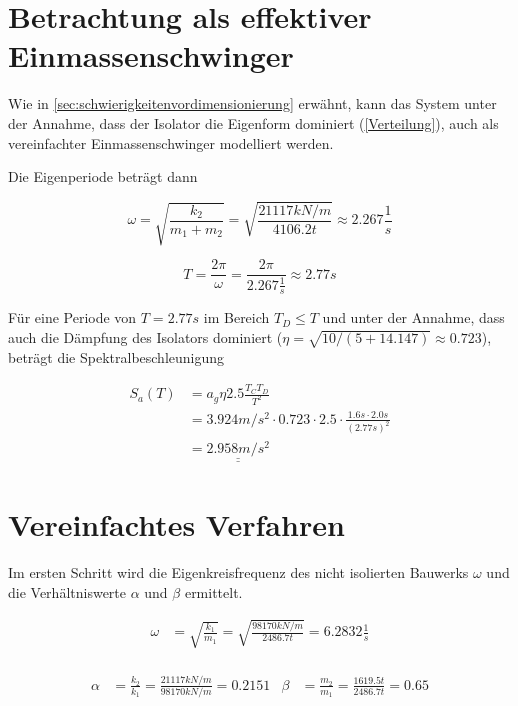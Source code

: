 \pagebreak

\section{Betrachtung als effektiver Einmassenschwinger}

Wie in \cref{sec:schwierigkeitenvordimensionierung} erwähnt, kann das System unter der Annahme, dass der Isolator die Eigenform dominiert (\cref{Verteilung}), auch als vereinfachter Einmassenschwinger modelliert werden.

Die Eigenperiode beträgt dann

\begin{equation*}
\omega = \sqrt{\frac{k_2}{m_1 + m_2}} = \sqrt{\frac{21117 kN/m}{4106.2 t}} \approx 2.267 \frac{1}{s}
\end{equation*}

\begin{equation*}
T = \frac{2 \pi}{\omega} = \frac{2 \pi}{2.267 \frac{1}{s}} \approx 2.77 s
\end{equation*}

Für eine Periode von $T = 2.77 s$ im Bereich $T_D \leq T$ und unter der Annahme, dass auch die Dämpfung des Isolators dominiert ($\eta=\sqrt{10/(5+14.147)} \approx 0.723$), beträgt die Spektralbeschleunigung

\begin{align*}
S_a(T) &= a_g \eta 2.5 \frac{T_C T_D}{T^2}\\
       &= 3.924 m/s^2 \cdot 0.723 \cdot 2.5 \cdot \frac{1.6 s \cdot 2.0 s}{(2.77 s)^2}\\
       &= \underline{\underline{2.958 m/s^2}}
\end{align*}

\pagebreak

\section{Vereinfachtes Verfahren}

Im ersten Schritt wird die Eigenkreisfrequenz des nicht isolierten Bauwerks $\omega$ und die Verhältniswerte $\alpha$ und $\beta$ ermittelt.

\begin{align*}
\omega &= \sqrt{\frac{k_1}{m_1}} = \sqrt{\frac{98170 kN/m}{2486.7 t}} = 6.2832 \frac{1}{s}\\
\end{align*}

\begin{align*}
\alpha &= \frac{k_2}{k_1} = \frac{21117 kN/m}{98170 kN/m} = 0.2151 & \beta  &= \frac{m_2}{m_1} = \frac{1619.5 t}{2486.7 t} = 0.65\\
\end{align*}

